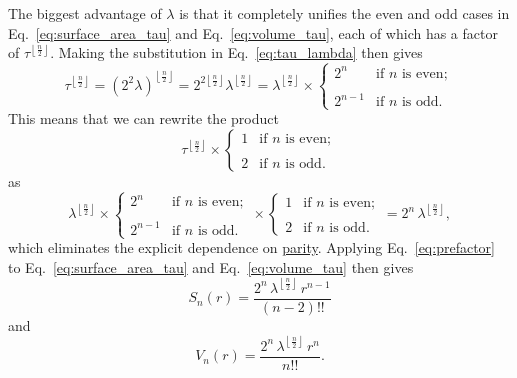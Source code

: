 The biggest advantage of $\lambda$ is that it completely unifies the even and odd cases in Eq.~\eqref{eq:surface_area_tau} and Eq.~\eqref{eq:volume_tau}, each of which has a factor of $\tau^{\left\lfloor \frac{n}{2} \right\rfloor}$. Making the substitution in Eq.~\eqref{eq:tau_lambda} then gives
\[
\tau^{\left\lfloor \frac{n}{2} \right\rfloor} = (2^2\lambda)^{\left\lfloor \frac{n}{2} \right\rfloor} = 2^{2\left\lfloor \frac{n}{2} \right\rfloor} \lambda^{\left\lfloor \frac{n}{2} \right\rfloor} =
\lambda^{\left\lfloor \frac{n}{2} \right\rfloor}\times
\begin{cases}
 2^n & \text{if } n \text{ is even}; \\ \\
 2^{n-1} & \text{if } n \text{ is odd}.
 \end{cases}
\]
This means that we can rewrite the product
\[
\tau^{\left\lfloor \frac{n}{2} \right\rfloor}\times \begin{cases}
1 & \text{if } n \text{ is even}; \\ \\
2 & \text{if } n \text{ is odd}.
\end{cases}
\]
as
\begin{equation}
\label{eq:prefactor}
\lambda^{\left\lfloor \frac{n}{2} \right\rfloor} \times
\begin{cases}
 2^n & \text{if } n \text{ is even}; \\ \\
 2^{n-1} & \text{if } n \text{ is odd}.
 \end{cases}
  \times \begin{cases}
 1 & \text{if } n \text{ is even}; \\ \\
 2 & \text{if } n \text{ is odd}.
 \end{cases}
 = 2^n\,\lambda^{\left\lfloor \frac{n}{2} \right\rfloor},
\end{equation}
which eliminates the explicit dependence on \href{https://en.wikipedia.org/wiki/Parity_(mathematics)}{parity}. Applying Eq.~\eqref{eq:prefactor} to \linebreak Eq.~\eqref{eq:surface_area_tau} and Eq.~\eqref{eq:volume_tau} then gives
\begin{equation}
\label{eq:surface_area_lambda}
S_n(r) = \frac{2^n\,\lambda^{\left\lfloor \frac{n}{2} \right\rfloor}\,r^{n-1}}{(n-2)!!}
\end{equation}
and
\begin{equation}
\label{eq:volume_lambda}
V_n(r) = \frac{2^n\,\lambda^{\left\lfloor \frac{n}{2} \right\rfloor}\,r^n}{n!!}.
\end{equation}

